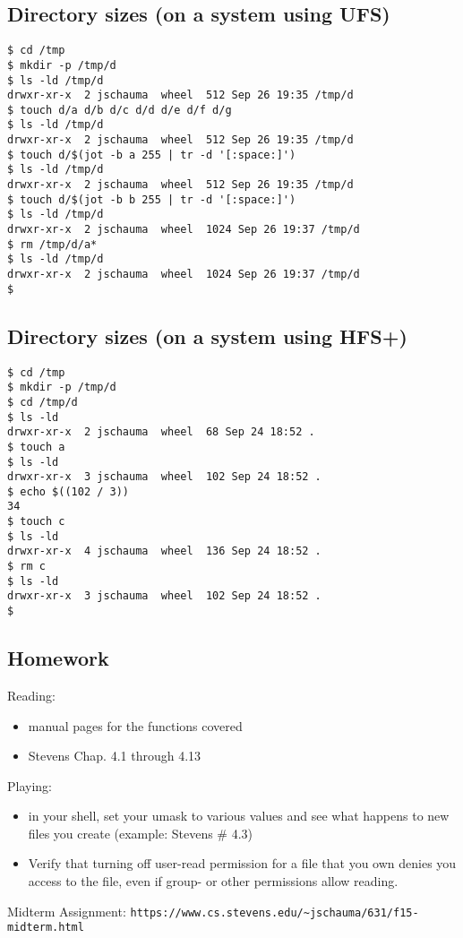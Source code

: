 \documentclass[xga]{xdvislides}
\begin{document}
\subsection{Directory sizes (on a system using UFS)}
\begin{verbatim}
$ cd /tmp
$ mkdir -p /tmp/d
$ ls -ld /tmp/d
drwxr-xr-x  2 jschauma  wheel  512 Sep 26 19:35 /tmp/d
$ touch d/a d/b d/c d/d d/e d/f d/g
$ ls -ld /tmp/d
drwxr-xr-x  2 jschauma  wheel  512 Sep 26 19:35 /tmp/d
$ touch d/$(jot -b a 255 | tr -d '[:space:]')
$ ls -ld /tmp/d
drwxr-xr-x  2 jschauma  wheel  512 Sep 26 19:35 /tmp/d
$ touch d/$(jot -b b 255 | tr -d '[:space:]')
$ ls -ld /tmp/d
drwxr-xr-x  2 jschauma  wheel  1024 Sep 26 19:37 /tmp/d
$ rm /tmp/d/a*
$ ls -ld /tmp/d
drwxr-xr-x  2 jschauma  wheel  1024 Sep 26 19:37 /tmp/d
$
\end{verbatim}

\subsection{Directory sizes (on a system using HFS+)}
\begin{verbatim}
$ cd /tmp
$ mkdir -p /tmp/d
$ cd /tmp/d
$ ls -ld
drwxr-xr-x  2 jschauma  wheel  68 Sep 24 18:52 .
$ touch a
$ ls -ld
drwxr-xr-x  3 jschauma  wheel  102 Sep 24 18:52 .
$ echo $((102 / 3))
34
$ touch c
$ ls -ld
drwxr-xr-x  4 jschauma  wheel  136 Sep 24 18:52 .
$ rm c
$ ls -ld
drwxr-xr-x  3 jschauma  wheel  102 Sep 24 18:52 .
$
\end{verbatim}

\subsection{Homework}
Reading:
\begin{itemize}
	\item manual pages for the functions covered
	\item Stevens Chap. 4.1 through 4.13
\end{itemize}
Playing:
\begin{itemize}
	\item in your shell, set your umask to various values and see what
          happens to new files you create (example: Stevens \# 4.3)
	\item Verify that turning off user-read permission for a file that you own
		denies you access to the file, even if group- or other permissions
		allow reading.
\end{itemize}
\addvspace{.5in}
Midterm Assignment:
\verb+https://www.cs.stevens.edu/~jschauma/631/f15-midterm.html+
\end{document}
